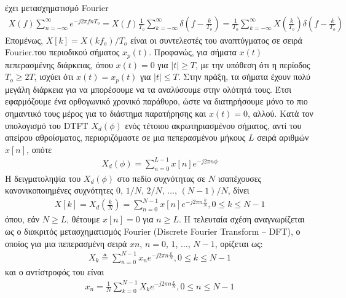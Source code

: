 \documentclass[letterpaper,10pt,english]{sphinxmanual}
\begin{document}
\sphinxAtStartPar
έχει μετασχηματισμό Fourier
\begin{equation*}
\begin{split}X(f)\sum_{n=-\infty}^{\infty}e^{-j2\pi f n T_o}= X(f)\frac{1}{T_o}\sum_{k=-\infty}^{\infty}\delta(f-\frac{k}{T_o})=\frac{1}{T_o}\sum_{k=-\infty}^{\infty}X(\frac{k}{T_o})\delta(f-\frac{k}{T_o})\end{split}
\end{equation*}
\sphinxAtStartPar
Επομένως, \(X[k] = X(kf_o)/Τ_o\) είναι οι συντελεστές του αναπτύγματος σε σειρά Fourier.του περιοδικού
σήματος \(x_p(t)\). Προφανώς, για σήματα \(x(t)\) πεπερασμένης διάρκειας, όπου \(x(t)=0\) για \(|t| ≥ T\), με την
υπόθεση ότι η περίοδος \(T_o ≥ 2T\), ισχύει ότι \(x(t) = x_p(t)\) για \(|t| ≤ T\).
Στην πράξη, τα σήματα έχουν πολύ μεγάλη διάρκεια για να μπορέσουμε να τα αναλύσουμε στην
ολότητά τους. Έτσι εφαρμόζουμε ένα ορθογωνικό χρονικό παράθυρο, ώστε να διατηρήσουμε μόνο
το πιο σημαντικό τους μέρος για το διάστημα παρατήρησης και \(x(t)= 0\), αλλού. Κατά τον
υπολογισμό του DTFT \(X_d(\phi)\) ενός τέτοιου ακρωτηριασμένου σήματος, αντί του απείρου
αθροίσματος, περιοριζόμαστε σε μια πεπερασμένου μήκους \(L\) σειρά αριθμών \(x[n]\), οπότε
\begin{equation*}
\begin{split}X_d (\phi)=\sum_{n=0}^{L-1}x[n]e^{-j2\pi n\phi}\end{split}
\end{equation*}
\sphinxAtStartPar
H δειγματοληψία του \(X_d(\phi)\) στο πεδίο συχνότητας σε \(Ν\) ισαπέχουσες κανονικοποιημένες συχνότητες \(0\), \(1/Ν\), \(2/Ν\), \(…\), \((Ν-1)/Ν\), δίνει
\begin{equation*}
\begin{split}X[k]=X_d (\frac{k}{N})=\sum_{n=0}^{N-1}x[n]e^{-j2\pi n\frac{k}{N}}, 0\leq k \leq N-1\end{split}
\end{equation*}
\sphinxAtStartPar
όπου, εάν \(N≥L\), θέτουμε \(x[n]=0\) για \(n≥L\). Η τελευταία σχέση αναγνωρίζεται ως ο διακριτός μετασχηματισμός Fourier (Discrete Fourier Transform – DFT), ο οποίος για μια πεπερασμένη σειρά \(xn\), \(n=0\), \(1\), \(…\), \(N-1\), ορίζεται ως:
\begin{equation*}
\begin{split}X_k\triangleq \sum_{n=0}^{N-1}x_n e^{-j2\pi n\frac{k}{N}}, 0\leq k \leq N-1\end{split}
\end{equation*}
\sphinxAtStartPar
και ο αντίστροφός του είναι
\begin{equation*}
\begin{split}x_n= \frac{1}{N} \sum_{k=0}^{N-1}X_k e^{-j2\pi n\frac{k}{N}}, 0\leq n \leq N-1\end{split}
\end{equation*}
\end{document}
